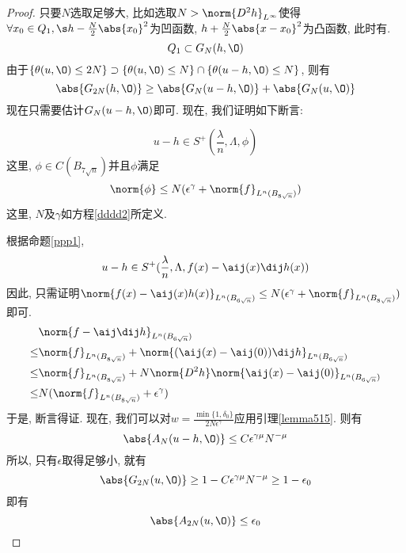 \begin{proof}
    只要$N$选取足够大, 比如选取$N>\norm{D^2h}_{L^\infty}$使得 $\forall x_0 \in Q_1, \s h-\frac{N}{2}\abs{x_0}^2$为凹函数, $h+\frac{N}{2}\abs{x-x_0}^2$为凸函数, 此时有.  
    \begin{equation}
        Q_1 \subset G_N(h, \O)
    \end{equation}
    由于$\{\theta(u, \O) \le 2N\} \supset \{\theta(u, \O)\le N\} \cap \{\theta(u-h, \O) \le N\}$, 则有
    \begin{equation}
        \abs{G_{2N}(h, \O)} \ge \abs{G_N(u-h, \O)} + \abs{G_N(u, \O)}
    \end{equation}
    现在只需要估计$G_N(u-h, \O)$即可.  现在, 我们证明如下断言: 
    \begin{claim}
        \begin{equation}
            u-h \in S^+(\frac{\lambda}{n}, \Lambda, \phi)
        \end{equation}
        这里, $\phi \in C(B_{7\sqrt{n}})$并且$\phi$满足
        \begin{equation}
            \norm{\phi} \le N(\epsilon^\gamma+\norm{f}_{L^n(B_{8\sqrt{n}})})
        \end{equation}
        这里, $N$及$\gamma$如方程\eqref{dddd2}所定义.  
    \end{claim}
    根据命题\eqref{ppp1}, 
    \begin{equation}
        u-h \in S^+(\frac{\lambda}{n}, \Lambda, f(x)-\aij(x)\dij h(x))
    \end{equation}
    因此, 只需证明$\norm{f(x)-\aij(x)h(x)}_{L^n(B_{6\sqrt{n}})} \le N(\epsilon^\gamma+\norm{f}_{L^n(B_{8\sqrt{n}})})$即可.  
    \begin{equation}
        \begin{split}
            &\norm{f-\aij\dij h}_{L^n(B_{6\sqrt{n}})}  \\
            \le &\norm{f}_{L^n(B_{8\sqrt{n}})}+\norm{(\aij(x)-\aij(0))\dij h}_{L^n(B_{6\sqrt{n}})}\\
            \le &\norm{f}_{L^n(B_{8\sqrt{n}})}+N\norm{D^2h}\norm{\aij(x)-\aij(0)}_{L^n(B_{6\sqrt{n}})}\\
            \le &N(\norm{f}_{L^n(B_{8\sqrt{n}})}+\epsilon^\gamma)
        \end{split}
    \end{equation}
    于是, 断言得证.  现在, 我们可以对$w=\frac{\min\{1, \delta_0\}}{2N\epsilon^\gamma}$应用引理\eqref{lemma515}.  则有
    \begin{equation}
        \abs{A_N(u-h, \O)} \le C\epsilon^{\gamma \mu}N^{-\mu}
    \end{equation}
    所以, 只有$\epsilon$取得足够小, 就有
    \begin{equation}
        \abs{G_{2N}(u, \O)} \ge 1-C\epsilon^{\gamma\mu}N^{-\mu} \ge 1-\epsilon_0
    \end{equation}
    即有
    \begin{equation}
        \abs{A_{2N}(u, \O)} \le \epsilon_0
    \end{equation}
\end{proof}
